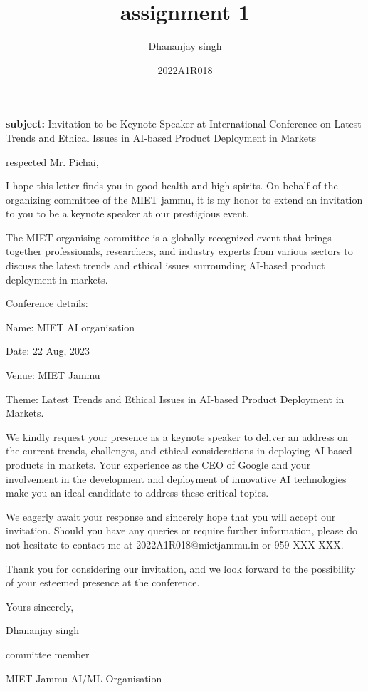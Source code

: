 \documentclass{article}
\title{assignment 1}
\author{Dhananjay singh}
\date{2022A1R018}
\begin{document}
\maketitle

 \textbf{subject:} Invitation to be Keynote Speaker at International Conference on Latest Trends and Ethical Issues in AI-based Product Deployment in Markets

 respected Mr. Pichai,

 I hope this letter finds you in good health and high spirits. On behalf of the organizing committee of the MIET jammu, it is my honor to extend an invitation to you to be a keynote speaker at our prestigious event.

 The MIET organising committee is a globally recognized event that brings together professionals, researchers, and industry experts from various sectors to discuss the latest trends and ethical issues surrounding AI-based product deployment in markets.


      Conference details:


    Name: MIET AI organisation

    
    Date: 22 Aug, 2023

    
    Venue: MIET Jammu

    
    Theme: Latest Trends and Ethical Issues in AI-based Product Deployment in Markets.

    We kindly request your presence as a keynote speaker to deliver an address on the current trends, challenges, and ethical considerations in deploying AI-based products in markets. Your experience as the CEO of Google and your involvement in the development and deployment of innovative AI technologies make you an ideal candidate to address these critical topics.

    We eagerly await your response and sincerely hope that you will accept our invitation. Should you have any queries or require further information, please do not hesitate to contact me at 2022A1R018@mietjammu.in or 959-XXX-XXX.

    Thank you for considering our invitation, and we look forward to the possibility of your esteemed presence at the conference.

Yours sincerely,

Dhananjay singh


committee member


MIET Jammu AI/ML Organisation
\end{document}
